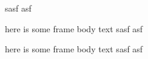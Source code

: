 \documentclass[]{beamer}
\begin{document}
\begin{frame}

sasf asf 

	here is some frame body text	%
 sasf asf 

	here is some frame body text	%
 sasf asf %

\end{frame}
\end{document}
